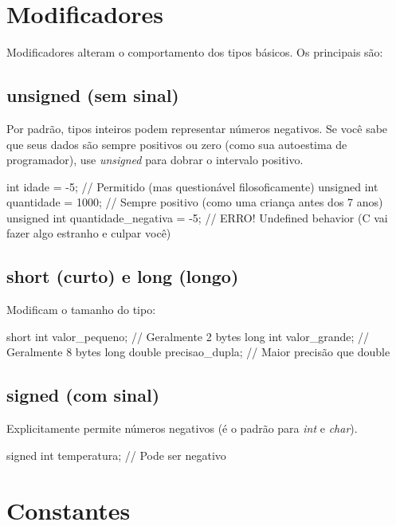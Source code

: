 \section{Modificadores}

Modificadores alteram o comportamento dos tipos básicos. Os principais são:

\subsection{unsigned (sem sinal)}

Por padrão, tipos inteiros podem representar números negativos. Se você sabe que seus dados são sempre positivos ou zero (como sua autoestima de programador), use \textit{unsigned} para dobrar o intervalo positivo.

\begin{ccode}
  int idade = -5;              // Permitido (mas questionável filosoficamente)
  unsigned int quantidade = 1000;  // Sempre positivo (como uma criança antes dos 7 anos)
  unsigned int quantidade_negativa = -5;  // ERRO! Undefined behavior (C vai fazer algo estranho e culpar você)
\end{ccode}

\subsection{short (curto) e long (longo)}

Modificam o tamanho do tipo:

\begin{ccode}
  short int valor_pequeno;     // Geralmente 2 bytes
  long int valor_grande;       // Geralmente 8 bytes
  long double precisao_dupla;  // Maior precisão que double
\end{ccode}

\subsection{signed (com sinal)}

Explicitamente permite números negativos (é o padrão para \textit{int} e \textit{char}).

\begin{ccode}
  signed int temperatura;      // Pode ser negativo
\end{ccode}

\section{Constantes}

